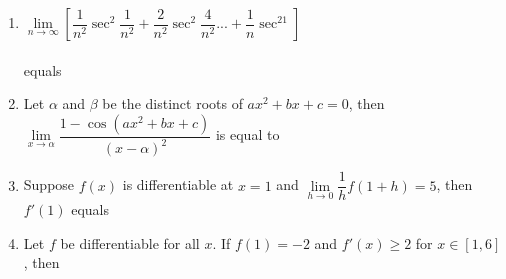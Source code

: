 \begin{enumerate}[label=\arabic*.,ref=\thesubsection.\theenumi]
\item $\lim\limits_{n \to \infty}\left[\dfrac{1}{n^2}\sec^2\dfrac{1}{n^2}+\dfrac{2}{n^2}\sec^2\dfrac{4}{n^2}...+\dfrac{1}{n}\sec^21\right]$ \\ \\equals
\begin{itemize}
\end{itemize}

\item Let $\alpha$ and $\beta$ be the distinct roots of $ax^2+bx+c=0$, then $\lim\limits_{x \to \alpha}\dfrac{1-\cos(ax^2+bx+c)}{(x-\alpha)^2}$ is equal to
\begin{itemize}
\end{itemize}

\item Suppose $f(x)$ is differentiable at $x=1$ and $\lim\limits_{h \to 0}\dfrac{1}{h}f(1+h)=5$, then $f'(1)$ equals
\begin{itemize}
\end{itemize}

\item Let $f$ be differentiable for all $x$. If $f(1)=-2$ and $f'(x)\geq 2$ for $x \in [1,6]$, then
\begin{itemize}
\end{itemize}


\end{enumerate}
